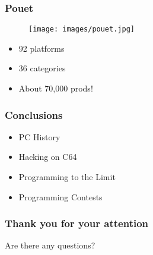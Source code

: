 \documentclass[aspectratio=43]{uva-inf-presentation}
\begin{document}

\begin{frame}
\frametitle{Pouet}

\begin{figure}
\texttt{[image: images/pouet.jpg]}
\end{figure}

\begin{itemize}
\item 92 platforms
\item 36 categories
\item About 70,000 prods!
\end{itemize}

\end{frame}


\begin{frame}
\frametitle{Conclusions}

\begin{itemize}
\item PC History
\item Hacking on C64
\item Programming to the Limit
\item Programming Contests
\end{itemize}

\end{frame}





\begin{frame}
\frametitle{Thank you for your attention}
\Large{\centerline{Are there any questions?}}
\end{frame}
\end{document}
